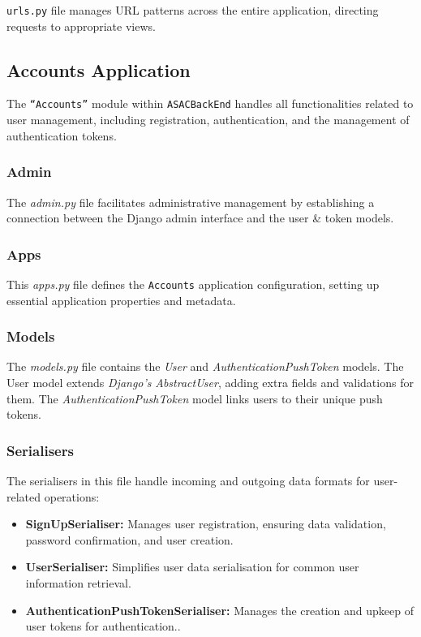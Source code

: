 \texttt{urls.py} file manages URL patterns across the entire application, directing requests to appropriate views.

\subsection{Accounts Application}

The \texttt{``Accounts''} module within \texttt{ASACBackEnd} handles all functionalities related to user management, including registration, authentication, and the management of authentication tokens.

\subsubsection{Admin} 

The \textit{admin.py} file facilitates administrative management by establishing a connection between the Django admin interface and the user \& token models.

\subsubsection{Apps} 

This \textit{apps.py} file defines the \texttt{Accounts} application configuration, setting up essential application properties and metadata.

\subsubsection{Models} 

The \textit{models.py} file contains the \textit{User} and \textit{AuthenticationPushToken} models. The User model extends \textit{Django's} \textit{AbstractUser}, adding extra fields and validations for them. The \textit{AuthenticationPushToken} model links users to their unique push tokens.

\subsubsection{Serialisers}

The serialisers in this file handle incoming and outgoing data formats for user-related operations:

\begin{itemize}
    \item \textbf{SignUpSerialiser:} Manages user registration, ensuring data validation, password confirmation, and user creation.
    \item \textbf{UserSerialiser:} Simplifies user data serialisation for common user information retrieval.
    \item \textbf{AuthenticationPushTokenSerialiser:} Manages the creation and upkeep of user tokens for authentication..
\end{itemize}

